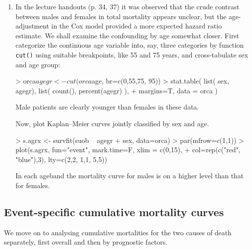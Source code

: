 \begin{enumerate}
\item In the lecture handouts (p. 34, 37) it was observed that
the crude contrast between males and females in total mortality appears
unclear, but the age-adjustment in the Cox model provided a more
expected hazard ratio estimate.
We shall examine the confounding by age somewhat closer.
First categorize the continuous age variable
into, say, three categories by function {\tt cut()}
using suitable breakpoints, like 55 and 75 years, and
cross-tabulate sex and age group:
\begin{Schunk}
\begin{Sinput}
> orca$agegr <- cut(orca$age, br=c(0,55,75, 95))
> stat.table( list( sex, agegr), list( count(), percent(agegr) ),
+              margins=T, data = orca )
\end{Sinput}
\end{Schunk}
Male patients are clearly younger than females in these data.

Now, plot Kaplan--Meier curves jointly classified by sex and age.
\begin{Schunk}
\begin{Sinput}
> s.agrx <- survfit(suob ~ agegr + sex, data=orca)
> par(mfrow=c(1,1))
> plot(s.agrx, fun="event", mark.time=F, xlim = c(0,15),
+              col=rep(c("red", "blue"),3), lty=c(2,2, 1,1, 5,5))
\end{Sinput}
\end{Schunk}

In each ageband the mortality curve for males is on a higher level
than that for females.

\end{enumerate}


\subsection{Event-specific cumulative mortality curves}


We move on to analysing cumulative mortalities for the
 two causes of death separately, first overall and then
 by prognostic factors.

